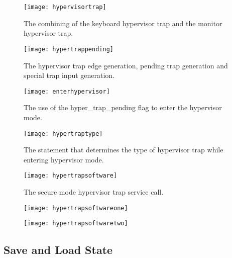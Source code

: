 \begin{figure}
  \centering
  \texttt{[image: hypervisortrap]}
  \caption{The combining of the keyboard hypervisor trap and the monitor hypervisor trap.}
  \label{fig:hypervisortrap}
\end{figure}

\begin{figure}
  \centering
  \texttt{[image: hypertrappending]}
  \caption{The hypervisor trap edge generation, pending trap generation and special trap input generation.}
  \label{fig:hypertrappending}
\end{figure}

\begin{figure}
  \centering
  \texttt{[image: enterhypervisor]}
  \caption{The use of the hyper\_trap\_pending flag to enter the hypervisor mode.}
  \label{fig:enterhypervisor}
\end{figure}

\begin{figure}
  \centering
  \texttt{[image: hypertraptype]}
  \caption{The statement that determines the type of hypervisor trap while entering hypervisor mode.}
  \label{fig:hypertraptype}
\end{figure}

\begin{figure}
  \centering
  \texttt{[image: hypertrapsoftware]}
  \caption{The secure mode hypervisor trap service call.}
  \label{fig:hypertrapsoftware}
\end{figure}

\begin{figure}
  \centering
  \texttt{[image: hypertrapsoftwareone]}
  \caption{}
  \label{fig:hypertrapsoftwareone}
\end{figure}

\begin{figure}
  \centering
  \texttt{[image: hypertrapsoftwaretwo]}
  \caption{}
  \label{fig:hypertrapsoftwaretwo}
\end{figure}


\subsection{Save and Load State}

\label{Ch6 Sec3 Sub2}


